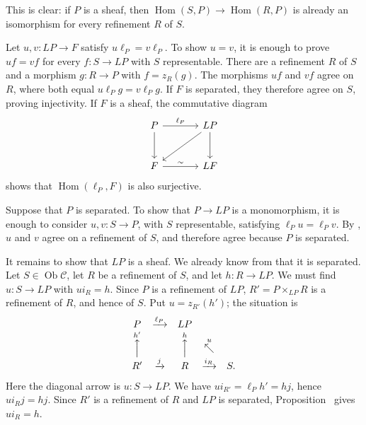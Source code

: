  This is clear: if \(P\) is a sheaf, then
\(\operatorname{Hom}(S,P)\to\operatorname{Hom}(R,P)\) is already an
isomorphism for every refinement \(R\) of \(S\).

 Let \(u,v:LP\to F\) satisfy \(u\ell_P=v\ell_P\). To show \(u=v\),
it is enough to prove \(uf=vf\) for every \(f:S\to LP\) with \(S\)
representable. There are a refinement \(R\) of \(S\) and a morphism
\(g:R\to P\) with \(f=z_R(g)\). The morphisms \(uf\) and \(vf\) agree on
\(R\), where both equal \(u\ell_Pg=v\ell_Pg\). If \(F\) is separated,
they therefore agree on \(S\), proving injectivity. If \(F\) is a sheaf,
the commutative diagram
\[
\begin{tikzcd}[column sep=large,row sep=large]
 P \arrow[r,"\ell_P"] \arrow[d] &
 LP \arrow[d] \arrow[dl]\\
 F \arrow[r,"\sim"] & LF
\end{tikzcd}
\]
shows that \(\operatorname{Hom}(\ell_P,F)\) is also surjective.

 Suppose that \(P\) is separated. To show that \(P\to LP\) is a
monomorphism, it is enough to consider \(u,v:S\to P\), with \(S\)
representable, satisfying \(\ell_Pu=\ell_Pv\). By , \(u\) and
\(v\) agree on a refinement of \(S\), and therefore agree because \(P\) is
separated.

It remains to show that \(LP\) is a sheaf. We already know from  that it
is separated. Let \(S\in\operatorname{Ob}\mathscr C\), let \(R\) be a
refinement of \(S\), and let \(h:R\to LP\). We must find \(u:S\to LP\)
with \(ui_R=h\). Since \(P\) is a refinement of \(LP\),
\(R'=P\times_{LP}R\) is a refinement of \(R\), and hence of \(S\). Put
\(u=z_{R'}(h')\); the situation is
\[
\begin{array}{ccccc}
 P&\xrightarrow{\ell_P}&LP&&\\
 \overset{h'}{\Big\uparrow}&&
 \overset{h}{\Big\uparrow}&\overset{u}{\nwarrow}&\\
 R'&\xrightarrow{j}&R&\xrightarrow{i_R}&S.
\end{array}
\]
Here the diagonal arrow is \(u:S\to LP\).
We have \(ui_{R'}=\ell_Ph'=hj\), hence \(ui_Rj=hj\). Since \(R'\) is a
refinement of \(R\) and \(LP\) is separated, Proposition~ gives
\(ui_R=h\).

